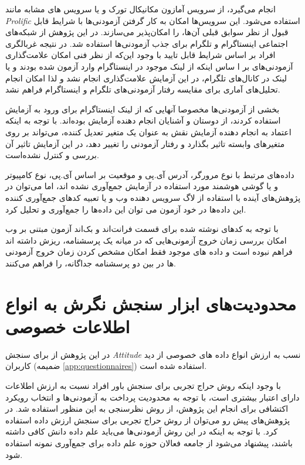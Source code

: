 انجام می‌گیرد، از سرویس آمازون مکانیکال تورک و یا سرویس های مشابه مانند
\textit{
    \gls{Prolific}
}
استفاده می‌شود. این سرویس‌ها امکان به کار گرفتن آزمودنی‌ها با شرایط قابل قبول
از نظر سوابق قبلی آن‌ها، را امکان‌پذیر می‌سازند. در این پژوهش از
شبکه‌های اجتماعی  اینستاگرام و تلگرام برای جذب آزمودنی‌ها استفاده شد. در
نتیجه غربالگری افراد بر اساس شرایط قابل تایید
با وجود این‌که از نظر فنی امکان علامت‌گذاری آزمودنی‌های بر ا ساس اینکه از لینک موجود در اینستاگرام وارد آزمون شده بودند و یا لینک
در کانال‌های تلگرام، در این آزمایش علامت‌گذاری انجام نشد و لذا امکان انجام تحلیل‌های آماری برای مقایسه رفتار آزمودنی‌های تلگرام و اینستاگرام
فراهم نشد.

بخشی از آزمودنی‌ها مخصوصا آنهایی که از لینک اینستاگرام برای ورود به آزمایش استفاده
کردند، از دوستان و آشنایان انجام دهنده آزمایش بوده‌اند. با توجه به اینکه اعتماد به انجام دهنده آزمایش نقش
به عنوان یک متغیر تعدیل کننده، می‌تواند بر روی متغیر‌های وابسته تاثیر بگذارد و رفتار آزمودنی را تغییر دهد،
در این آزمایش تاثیر آن بررسی و کنترل نشده‌است.

داده‌های مرتبط با نوع مرورگر، آدرس آی.پی و موقعیت بر اساس آی.پی، نوع کامپیوتر و یا گوشی هوشمند مورد استفاده
در آزمایش جمع‌آوری نشده اند، اما می‌توان در پژوهش‌های آینده با استفاده از لاگ سرویس دهنده وب و یا تعبیه کدهای جمع‌آوری کننده این داده‌ها
در خود آزمون می توان این داده‌ها را جمع‌آوری و تحلیل کرد.

با توجه به کدهای نوشته شده برای قسمت فرانت‌اند و بک‌اند آزمون مبتنی بر وب امکان بررسی زمان خروج آزمونی‌هایی که در میانه یک پرسشنامه،
ریزش داشته اند فراهم نبوده است و داده های موجود فقط امکان مشخص کردن زمان خروج آزمودنی ها در بین دو پرسشنامه جداگانه، را فراهم  می‌کنند.

\section*{محدودیت‌های ابزار سنجش نگرش به انواع اطلاعات خصوصی}
در این پژوهش از برای سنجش
{\textit{\gls{Attitude}}}
نسب به ارزش انواع داده های خصوصی از دید کاربران
(ضمیمه \ref{app:questionnaires})
استفاده شده است.

با وجود اینکه روش حراج تجربی برای سنجش باور افراد نسبت به ارزش اطلاعات دارای اعتبار بیشتری است، با توجه به محدودیت پرداخت
به آزمودنی‌ها و انتخاب رویکرد اکتشافی برای انجام این پژوهش، از روش نظرسنجی به این منظور استفاده شد. در پژوهش‌های پیش رو می‌توان از روش حراج تجربی برای سنجش ارزش داده
استفاده کرد. با توجه به اینکه در این روش آزمودنی‌ها می‌باید علم داده دانش کافی داشته باشند، پیشنهاد می‌شود از جامعه فعالان حوزه علم داده برای جمع‌آوری نمونه استفاده
شود.
